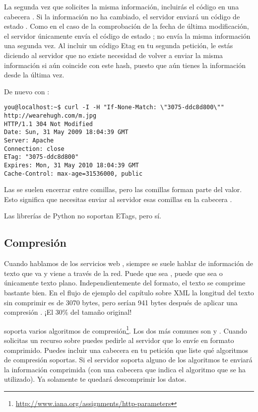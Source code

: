 La segunda vez que solicites la misma información, incluirás el código  en una cabecera . Si la información no ha cambiado, el servidor enviará un código de estado . Como en el caso de la comprobación de la fecha de última modificación, el servidor únicamente envía el código de estado ; no envía la misma información una segunda vez. Al incluir un código Etag en tu segunda petición, le estás diciendo al servidor que no existe necesidad de volver a enviar la misma información si aún coincide con este hash, puesto que aún tienes la información desde la última vez.


De nuevo con :

\noindent\begin{minipage}{\textwidth}
\begin{lstlisting}[mathescape=False]
you@localhost:~$ curl -I -H "If-None-Match: \"3075-ddc8d800\"" 
http://wearehugh.com/m.jpg
HTTP/1.1 304 Not Modified
Date: Sun, 31 May 2009 18:04:39 GMT
Server: Apache
Connection: close
ETag: "3075-ddc8d800"
Expires: Mon, 31 May 2010 18:04:39 GMT
Cache-Control: max-age=31536000, public
\end{lstlisting}
\end{minipage}

Las  se suelen encerrar entre comillas, pero las comillas forman parte del valor. Esto significa que necesitas enviar al servidor esas comillas en la cabecera .

Las librerías de Python  no soportan ETags, pero  sí.

\subsection{Compresión}

Cuando hablamos de los servicios web , siempre se suele hablar de información de texto que va y viene a través de la red. Puede que sea , puede que sea  o únicamente texto plano. Independientemente del formato, el texto se comprime bastante bien. En el flujo de ejemplo del capítulo sobre XML la longitud del texto sin comprimir es de 3070 bytes, pero serían 941 bytes después de aplicar una compresión . ¡El 30\% del tamaño original!

 soporta varios algoritmos de compresión\footnote{\href{http://www.iana.org/assignments/http-parameters}{http://www.iana.org/assignments/http-parameters}}. Los dos más comunes son  y . Cuando solicitas un recurso sobre  puedes pedirle al servidor que lo envíe en formato comprimido. Puedes incluir una cabecera  en tu petición que liste qué algoritmos de compresión soportas. Si el servidor soporta alguno de los algoritmos te enviará la información comprimida (con una cabecera  que indica el algoritmo que se ha utilizado). Ya solamente te quedará descomprimir los datos.

